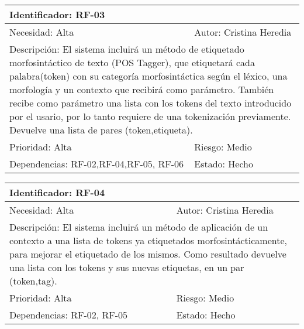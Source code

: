 \begin{table}[H]
\label{my-label}
\begin{tabular}{|l|l|l|l|l|l|l|}
\hline
\multicolumn{7}{|l|}{\textcolor{SchoolColor}{Identificador:} RF-03}                                 \\ \hline
\multicolumn{4}{|l|}{\textcolor{SchoolColor}{Necesidad:} Alta} & \multicolumn{3}{l|}{\textcolor{SchoolColor}{Autor:} Cristina Heredia}         \\ \hline
\multicolumn{7}{|L|}{\textcolor{SchoolColor}{Descripción:} El sistema incluirá un método de etiquetado morfosintáctico de texto (POS Tagger), que etiquetará cada palabra(token) con su categoría morfosintáctica según el léxico, una morfología y un contexto que recibirá como parámetro.  También recibe como parámetro una lista con los tokens del texto introducido por el usario, por lo tanto requiere de una tokenización previamente. Devuelve una lista de pares (token,etiqueta).  }                                 \\ \hline
\multicolumn{4}{|l|}{\textcolor{SchoolColor}{Prioridad: }Alta} & \multicolumn{3}{l|}{\textcolor{SchoolColor}{Riesgo:} Medio}         \\ \hline
\multicolumn{5}{|l|}{\textcolor{SchoolColor}{Dependencias: }RF-02,RF-04,RF-05, RF-06}         & \multicolumn{2}{l|}{\textcolor{SchoolColor}{Estado:} Hecho} \\ \hline
\end{tabular}
\end{table}

\begin{table}[H]
\label{my-label}
\begin{tabular}{|l|l|l|l|l|l|l|}
\hline
\multicolumn{7}{|l|}{\textcolor{SchoolColor}{Identificador:} RF-04}                                 \\ \hline
\multicolumn{4}{|l|}{\textcolor{SchoolColor}{Necesidad:} Alta} & \multicolumn{3}{l|}{\textcolor{SchoolColor}{Autor:} Cristina Heredia}         \\ \hline
\multicolumn{7}{|L|}{\textcolor{SchoolColor}{Descripción:} El sistema incluirá un método de aplicación de un contexto a una lista de tokens ya etiquetados morfosintácticamente, para mejorar el etiquetado de los mismos. Como resultado devuelve una lista con los tokens y sus nuevas etiquetas, en un par (token,tag).}                                 \\ \hline
\multicolumn{4}{|l|}{\textcolor{SchoolColor}{Prioridad: }Alta} & \multicolumn{3}{l|}{\textcolor{SchoolColor}{Riesgo:} Medio}         \\ \hline
\multicolumn{5}{|l|}{\textcolor{SchoolColor}{Dependencias: } RF-02, RF-05}         & \multicolumn{2}{l|}{\textcolor{SchoolColor}{Estado:} Hecho} \\ \hline
\end{tabular}
\end{table}

